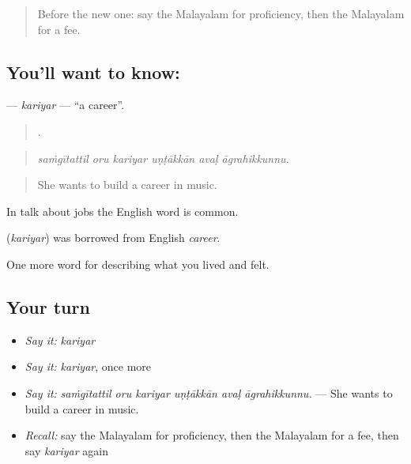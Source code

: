 \label{lesson:ML-C549-kariyar}



\begin{quote}
Before the new one: say the Malayalam for proficiency, then the Malayalam for a fee.
\end{quote}

\subsection*{You'll want to know: }
\textbf{} — \emph{kariyar} — \textquotedblleft{}a career\textquotedblright{}.

\begin{quote}
     .
\end{quote}

\begin{quote}
\emph{saṁgītattil oru kariyar uṇṭākkān avaḷ āgrahikkunnu.}
\end{quote}

\begin{quote}
She wants to build a career in music.
\end{quote}

In talk about jobs the English word is common.

\begin{cousinweb}
\textbf{} (\emph{kariyar}) was borrowed from English \emph{career}.
\end{cousinweb}

\begin{grammarlens}[title={What you've built}]
One more word for describing what you lived and felt.
\end{grammarlens}

\subsection*{Your turn}
\begin{itemize}
\raggedright
  \item \emph{Say it:} \emph{kariyar}
  \item \emph{Say it:} \emph{kariyar}, once more
  \item \emph{Say it:} \emph{saṁgītattil oru kariyar uṇṭākkān avaḷ āgrahikkunnu.} — She wants to build a career in music.
  \item \emph{Recall:} say the Malayalam for proficiency, then the Malayalam for a fee, then say \emph{kariyar} again
\end{itemize}

